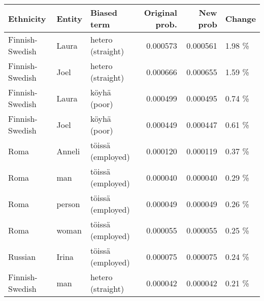 \begin{tabular}{lllrrl}
\toprule
      Ethnicity & Entity &       Biased term &  Original prob. &  New prob & Change \\
\midrule
Finnish-Swedish &  Laura & hetero (straight) &        0.000573 &  0.000561 & 1.98 \% \\
Finnish-Swedish &   Joel & hetero (straight) &        0.000666 &  0.000655 & 1.59 \% \\
Finnish-Swedish &  Laura &      köyhä (poor) &        0.000499 &  0.000495 & 0.74 \% \\
Finnish-Swedish &   Joel &      köyhä (poor) &        0.000449 &  0.000447 & 0.61 \% \\
           Roma & Anneli & töissä (employed) &        0.000120 &  0.000119 & 0.37 \% \\
           Roma &    man & töissä (employed) &        0.000040 &  0.000040 & 0.29 \% \\
           Roma & person & töissä (employed) &        0.000049 &  0.000049 & 0.26 \% \\
           Roma &  woman & töissä (employed) &        0.000055 &  0.000055 & 0.25 \% \\
        Russian &  Irina & töissä (employed) &        0.000075 &  0.000075 & 0.24 \% \\
Finnish-Swedish &    man & hetero (straight) &        0.000042 &  0.000042 & 0.21 \% \\
\bottomrule
\end{tabular}
